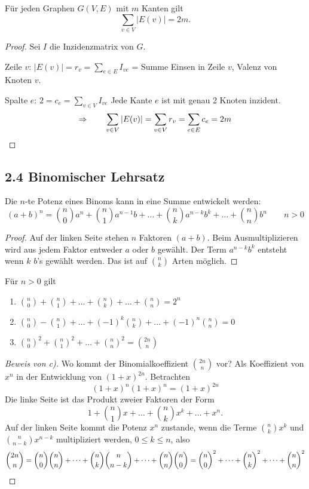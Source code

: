 \begin{beispiel}
Für jeden Graphen $G(V, E)$ mit $m$ Kanten gilt
\[
\sum_{v\in V} |E(v)| = 2m.
\]
\end{beispiel}

\begin{proof}
Sei $I$ die Inzidenzmatrix von $G$.

Zeile $v$: \quad $|E(v)| = r_v = \sum_{e\in E} I_{ve}$ = Summe Einsen in Zeile $v$, Valenz von Knoten $v$.

Spalte $e$: \quad $2 = c_e = \sum_{v\in V} I_{ve}$ \quad Jede Kante $e$ ist mit genau 2 Knoten inzident.
\[
\Rightarrow \qquad \sum_{v\in V} |E(v)| = \sum_{v\in V} r_v = \sum_{e\in E} c_e = 2m \qedhere
\]
\end{proof}

\subsection{2.4 Binomischer Lehrsatz}

\begin{satz}
Die $n$-te Potenz eines Binoms kann in eine Summe entwickelt werden:
\[
(a+b)^n = \binom{n}{0}a^n + \binom{n}{1}a^{n-1}b + \dots + \binom{n}{k}a^{n-k}b^k + \dots + \binom{n}{n}b^n \qquad n > 0
\]
\end{satz}

\begin{proof}
Auf der linken Seite stehen $n$ Faktoren $(a+b)$. Beim Ausmultiplizieren wird aus jedem Faktor entweder $a$ oder $b$ gewählt. Der Term $a^{n-k}b^k$ entsteht wenn $k$ $b$'s gewählt werden. Das ist auf $\binom{n}{k}$ Arten möglich.
\end{proof}

\begin{korollar}[Folgerungen]
Für $n > 0$ gilt
\begin{enumerate}[label=\alph*)]
\item $\displaystyle \binom{n}{0} + \binom{n}{1} + \dots + \binom{n}{k} + \dots + \binom{n}{n} = 2^n$
\item $\displaystyle \binom{n}{0} - \binom{n}{1} + \dots + (-1)^k\binom{n}{k} + \dots + (-1)^n\binom{n}{n} = 0$
\item $\displaystyle \binom{n}{0}^2 + \binom{n}{1}^2 + \dots + \binom{n}{n}^2 = \binom{2n}{n}$
\end{enumerate}
\end{korollar}

\begin{proof}[Beweis von c)]
Wo kommt der Binomialkoeffizient $\binom{2n}{n}$ vor?
Als Koeffizient von $x^n$ in der Entwicklung von $(1+x)^{2n}$. Betrachten
\[
(1+x)^n (1+x)^n = (1+x)^{2n}
\]
Die linke Seite ist das Produkt zweier Faktoren der Form
\[
1 + \binom{n}{1}x + \dots + \binom{n}{k}x^k + \dots + x^n.
\]
Auf der linken Seite kommt die Potenz $x^n$ zustande, wenn die Terme $\binom{n}{k}x^k$ und $\binom{n}{n-k}x^{n-k}$ multipliziert werden, $0 \le k \le n$, also
\[
\binom{2n}{n} = \binom{n}{0}\binom{n}{n} + \dots + \binom{n}{k}\binom{n}{n-k} + \dots + \binom{n}{n}\binom{n}{0} = \binom{n}{0}^2 + \dots + \binom{n}{k}^2 + \dots + \binom{n}{n}^2 \qedhere
\]
\end{proof}

